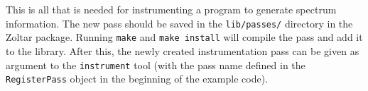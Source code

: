 This is all that is needed for instrumenting a program to generate
spectrum information.
The new pass should be saved in the \texttt{lib/passes/} directory 
in the Zoltar package.
Running \texttt{make} and \texttt{make install} will compile the pass
and add it to the library.
After this, the newly created instrumentation pass can be given
as argument to the \texttt{instrument} tool
(with the pass name defined in the \texttt{RegisterPass} object in the beginning of the example code).
